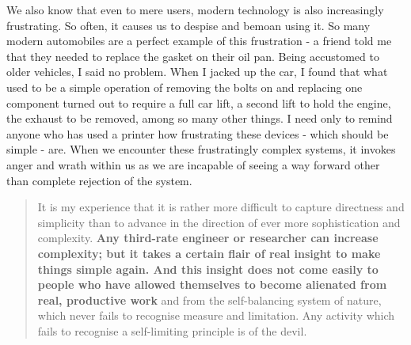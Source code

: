 \documentclass[letterpaper]{article}
\begin{document}
We also know that even to mere users, modern technology is also increasingly frustrating. So often, it causes us to despise and bemoan using it. So many modern automobiles are a perfect example of this frustration - a friend told me that they needed to replace the gasket on their oil pan. Being accustomed to older vehicles, I said no problem. When I jacked up the car, I found that what used to be a simple operation of removing the bolts on and replacing one component turned out to require a full car lift, a second lift to hold the engine, the exhaust to be removed, among so many other things. I need only to remind anyone who has used a printer how frustrating these devices - which should be simple - are. When we encounter these frustratingly complex systems, it invokes anger and wrath within us as we are incapable of seeing a way forward other than complete rejection of the system.

\begin{quote}
  It is my experience that it is rather more difficult to capture directness and simplicity than to advance in the direction of ever more sophistication and complexity. \textbf{Any third-rate engineer or researcher can increase complexity; but it takes a certain flair of real insight to make things simple again. And this insight does not come easily to people who have allowed themselves to become alienated from real, productive work} and from the self-balancing system of nature, which never fails to recognise measure and limitation. Any activity which fails to recognise a self-limiting principle is of the devil.
\end{quote}


\end{document}

